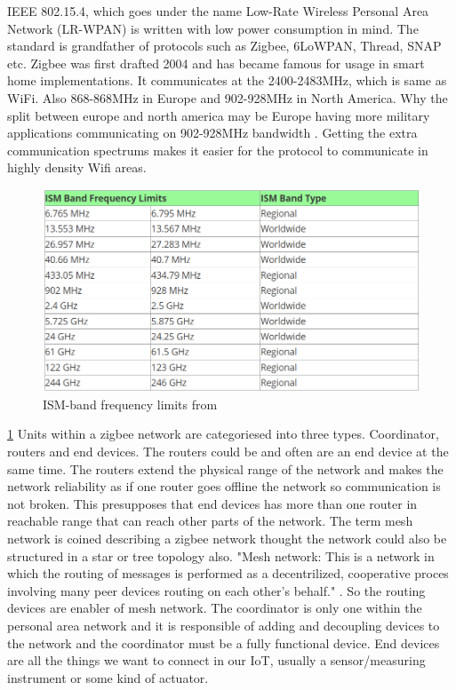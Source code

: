 \documentclass[article,a4paper]{IEEEtran}
\begin{document}
    \newline\newline
    IEEE 802.15.4, which goes under the name Low-Rate Wireless Personal Area Network (LR-WPAN) is written with low power consumption in mind. The standard is grandfather of protocols such as Zigbee, 6LoWPAN, Thread, SNAP etc. Zigbee was first drafted 2004 and has became famous for usage in smart home implementations. It communicates at the 2400-2483MHz, which is same as WiFi. Also 868-868MHz in Europe and 902-928MHz in North America. Why the split between europe and north america may be Europe having more military applications communicating on 902-928MHz bandwidth \cite{ISM-bandEUR}. Getting the extra communication spectrums makes it easier for the protocol to communicate in highly density Wifi areas. 
    \begin{figure}
        \includegraphics[width=\columnwidth]{ISM-band.png} 
        \caption{ISM-band frequency limits from \cite{ISM-band1}}
        \label{fig1:ISM-band frequency limits}   
    \end{figure}
    \ref{fig1:ISM-band frequency limits}
    Units within a zigbee network are categoriesed into three types. Coordinator, routers and end devices. The routers could be and often are an end device at the same time. The routers extend the physical range of the network and makes the network reliability as if one router goes offline the network so communication is not broken. This presupposes that end devices has more than one router in reachable range that can reach other parts of the network. The term mesh network is coined describing a zigbee network thought the network could also be structured in a star or tree topology also. "Mesh network: This is a network in which the routing of messages is performed as a decentrilized, cooperative proces involving many peer devices routing on each other's behalf." \cite{ZigbeeSpec}. So the routing devices are enabler of mesh network. The coordinator is only one within the personal area network and it is responsible of adding and decoupling devices to the network and the coordinator must be a fully functional device. End devices are all the things we want to connect in our IoT, usually a sensor/measuring instrument or some kind of actuator. 
\end{document}
